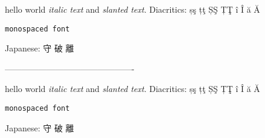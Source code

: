 \documentclass[10pt]{article}
\newcommand{\jptext}[1]{\sffamily#1}
\begin{document}
hello world \textit{italic text} and \textsl{slanted text}.
Diacritics: șş țţ ȘŞ ȚŢ î Î ă Ă

\texttt{monospaced font}

Japanese: \jptext{守 破 離}

----------------------------------------------

\sffamily
hello world \textit{italic text} and \textsl{slanted text}.
Diacritics: șş țţ ȘŞ ȚŢ î Î ă Ă

\texttt{monospaced font}

Japanese: \jptext{守 破 離}
\end{document}
